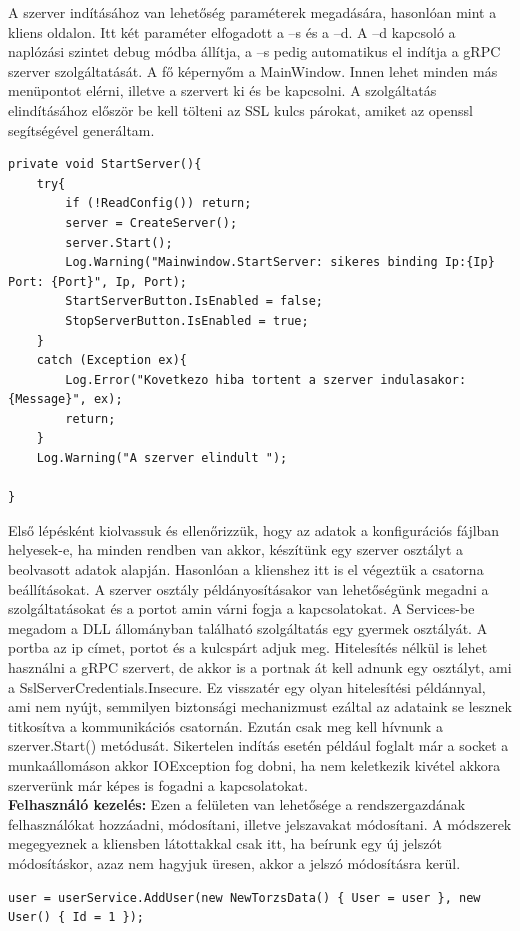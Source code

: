\documentclass[
]{thesis-ekf}
\theoremstyle{definition}
\theoremstyle{remark}
\begin{document}
A szerver indításához van lehetőség paraméterek megadására, hasonlóan mint a kliens oldalon. Itt két paraméter elfogadott a –s és a –d. A –d kapcsoló a naplózási szintet debug módba állítja, a –s pedig automatikus el indítja a gRPC szerver szolgáltatását. A fő képernyőm a MainWindow. Innen lehet minden más menüpontot elérni, illetve a szervert ki és be kapcsolni. A szolgáltatás elindításához először be kell tölteni az SSL kulcs párokat, amiket az openssl segítségével generáltam. \cite{openssl}
\begin{lstlisting}[showstringspaces=false,caption={gRPC szerver indítása.},captionpos=b]
private void StartServer(){
	try{
		if (!ReadConfig()) return;
		server = CreateServer();
		server.Start();
		Log.Warning("Mainwindow.StartServer: sikeres binding Ip:{Ip} Port: {Port}", Ip, Port);
		StartServerButton.IsEnabled = false;
		StopServerButton.IsEnabled = true;
	}
	catch (Exception ex){
		Log.Error("Kovetkezo hiba tortent a szerver indulasakor: {Message}", ex);
		return;
	}
	Log.Warning("A szerver elindult ");

}
\end{lstlisting}
Első lépésként kiolvassuk és ellenőrizzük, hogy az adatok a konfigurációs fájlban helyesek-e, ha minden rendben van akkor, készítünk egy szerver osztályt a beolvasott adatok alapján. Hasonlóan a klienshez itt is el végeztük a csatorna beállításokat.\cite{channel} A szerver osztály példányosításakor van lehetőségünk megadni a szolgáltatásokat és a portot amin várni fogja a kapcsolatokat. A Services-be megadom a DLL állományban található szolgáltatás egy gyermek osztályát. A portba az ip címet, portot és a kulcspárt adjuk meg. Hitelesítés nélkül is lehet használni a gRPC szervert, de akkor is a portnak át kell adnunk egy osztályt, ami a SslServerCredentials.Insecure. Ez visszatér egy olyan hitelesítési példánnyal, ami nem nyújt, semmilyen biztonsági mechanizmust ezáltal az adataink se lesznek titkosítva a kommunikációs csatornán.\cite{serverauth} Ezután csak meg kell hívnunk a szerver.Start() metódusát. Sikertelen indítás esetén például foglalt már a socket a munkaállomáson akkor IOException fog dobni, ha nem keletkezik kivétel akkora szerverünk már képes is fogadni a kapcsolatokat.\\
\textbf{Felhasználó kezelés: }
Ezen a felületen van lehetősége a rendszergazdának felhasználókat hozzáadni, módosítani, illetve jelszavakat módosítani. A módszerek megegyeznek a kliensben látottakkal csak itt, ha beírunk egy új jelszót módosításkor, azaz nem hagyjuk üresen, akkor a jelszó módosításra kerül.
\begin{lstlisting}[showstringspaces=false,caption={Szerver oldali felhasználó kezelés usere.}, captionpos=b]
user = userService.AddUser(new NewTorzsData() { User = user }, new User() { Id = 1 });
\end{lstlisting}
 
\end{document}
